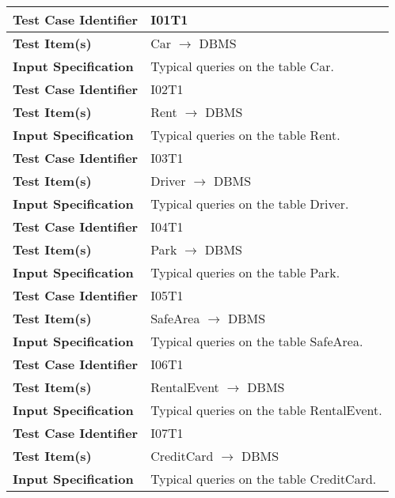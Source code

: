\begin{tabular}{l p{}}
    \hline
    \textbf{Test Case Identifier} & I01T1\\
    \hline
    \textbf{Test Item(s)} & Car $\rightarrow$ DBMS \\
    \hline
    \textbf{Input Specification} & Typical queries on the table Car. \\
    \hline
    \hline
    \textbf{Test Case Identifier} & I02T1\\
    \hline
    \textbf{Test Item(s)} & Rent $\rightarrow$ DBMS \\
    \hline
    \textbf{Input Specification} & Typical queries on the table Rent. \\
    \hline
    \hline
    \textbf{Test Case Identifier} & I03T1\\
    \hline
    \textbf{Test Item(s)} & Driver $\rightarrow$ DBMS \\
    \hline
    \textbf{Input Specification} & Typical queries on the table Driver. \\
    \hline
    \hline
    \textbf{Test Case Identifier} & I04T1\\
    \hline
    \textbf{Test Item(s)} & Park $\rightarrow$ DBMS \\
    \hline
    \textbf{Input Specification} & Typical queries on the table Park. \\
    \hline
    \hline
    \textbf{Test Case Identifier} & I05T1\\
    \hline
    \textbf{Test Item(s)} & SafeArea $\rightarrow$ DBMS \\
    \hline
    \textbf{Input Specification} & Typical queries on the table SafeArea. \\
    \hline
    \hline
    \textbf{Test Case Identifier} & I06T1\\
    \hline
    \textbf{Test Item(s)} & RentalEvent $\rightarrow$ DBMS \\
    \hline
    \textbf{Input Specification} & Typical queries on the table RentalEvent. \\
    \hline
    \hline
    \textbf{Test Case Identifier} & I07T1\\
    \hline
    \textbf{Test Item(s)} & CreditCard $\rightarrow$ DBMS \\
    \hline
    \textbf{Input Specification} & Typical queries on the table CreditCard. \\
    \hline
\end{tabular}

